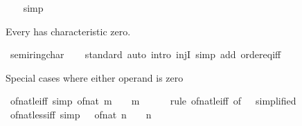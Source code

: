 \begin{isabellebody}
%
\isadelimproof
\ \ %
\endisadelimproof
%
\isatagproof
{}\isamarkupfalse%
\ simp%
\endisatagproof
{\isafoldproof}%
%
\isadelimproof
%
\endisadelimproof
%
\begin{isamarkuptext}%
Every  has characteristic zero.%
\end{isamarkuptext}\isamarkuptrue%
\isamarkupfalse%
\ semiring{\isacharunderscore}{\kern0pt}char{\isacharunderscore}{\kern0pt}{}\isanewline
%
\isadelimproof
\ \ %
\endisadelimproof
%
\isatagproof
{}\isamarkupfalse%
\ standard\ {\isacharparenleft}{\kern0pt}auto\ intro{\isacharbang}{\kern0pt}{\isacharcolon}{\kern0pt}\ injI\ simp\ add{\isacharcolon}{\kern0pt}\ order{\isachardot}{\kern0pt}eq{\isacharunderscore}{\kern0pt}iff{\isacharparenright}{\kern0pt}%
\endisatagproof
{\isafoldproof}%
%
\isadelimproof
%
\endisadelimproof
%
\begin{isamarkuptext}%
Special cases where either operand is zero%
\end{isamarkuptext}\isamarkuptrue%
\isamarkupfalse%
\ of{\isacharunderscore}{\kern0pt}nat{\isacharunderscore}{\kern0pt}le{\isacharunderscore}{\kern0pt}{}{\isacharunderscore}{\kern0pt}iff\ {\isacharbrackleft}{\kern0pt}simp{\isacharbrackright}{\kern0pt}{\isacharcolon}{\kern0pt}\ {\isachardoublequoteopen}of{\isacharunderscore}{\kern0pt}nat\ m\ {\isasymle}\ {}\ {\isasymlongleftrightarrow}\ m\ {\isacharequal}{\kern0pt}\ {}{\isachardoublequoteclose}\isanewline
%
\isadelimproof
\ \ %
\endisadelimproof
%
\isatagproof
{}\isamarkupfalse%
\ {\isacharparenleft}{\kern0pt}rule\ of{\isacharunderscore}{\kern0pt}nat{\isacharunderscore}{\kern0pt}le{\isacharunderscore}{\kern0pt}iff\ {\isacharbrackleft}{\kern0pt}of\ {\isacharunderscore}{\kern0pt}\ {}{\isacharcomma}{\kern0pt}\ simplified{\isacharbrackright}{\kern0pt}{\isacharparenright}{\kern0pt}%
\endisatagproof
{\isafoldproof}%
%
\isadelimproof
\isanewline
%
\endisadelimproof
\isanewline
{}\isamarkupfalse%
\ of{\isacharunderscore}{\kern0pt}nat{\isacharunderscore}{\kern0pt}{}{\isacharunderscore}{\kern0pt}less{\isacharunderscore}{\kern0pt}iff\ {\isacharbrackleft}{\kern0pt}simp{\isacharbrackright}{\kern0pt}{\isacharcolon}{\kern0pt}\ {\isachardoublequoteopen}{}\ {\isacharless}{\kern0pt}\ of{\isacharunderscore}{\kern0pt}nat\ n\ {\isasymlongleftrightarrow}\ {}\ {\isacharless}{\kern0pt}\ n{\isachardoublequoteclose}\isanewline

\end{isabellebody}
